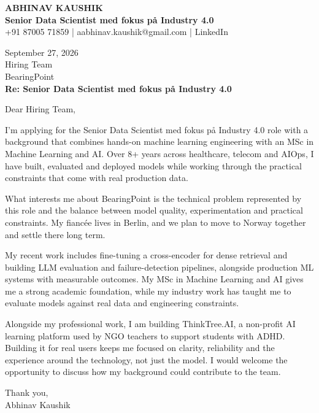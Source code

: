 \documentclass[10pt,a4paper]{article}
\begin{document}
\begin{center}
{\Large\bfseries ABHINAV KAUSHIK}\\[2pt]
{\bfseries Senior Data Scientist med fokus på Industry 4.0}\\[2pt]
+91 87005 71859 \quad | \quad aabhinav.kaushik@gmail.com \quad | \quad LinkedIn
\end{center}
\vspace{8pt}
September 27, 2026\\[6pt]
Hiring Team\\
BearingPoint\\[4pt]
\textbf{Re: Senior Data Scientist med fokus på Industry 4.0}

Dear Hiring Team,

I’m applying for the Senior Data Scientist med fokus på Industry 4.0 role with a background that combines hands-on machine learning engineering with an MSc in Machine Learning and AI. Over 8+ years across healthcare, telecom and AIOps, I have built, evaluated and deployed models while working through the practical constraints that come with real production data.

What interests me about BearingPoint is the technical problem represented by this role and the balance between model quality, experimentation and practical constraints. My fiancée lives in Berlin, and we plan to move to Norway together and settle there long term.

My recent work includes fine-tuning a cross-encoder for dense retrieval and building LLM evaluation and failure-detection pipelines, alongside production ML systems with measurable outcomes. My MSc in Machine Learning and AI gives me a strong academic foundation, while my industry work has taught me to evaluate models against real data and engineering constraints.

Alongside my professional work, I am building ThinkTree.AI, a non-profit AI learning platform used by NGO teachers to support students with ADHD. Building it for real users keeps me focused on clarity, reliability and the experience around the technology, not just the model. I would welcome the opportunity to discuss how my background could contribute to the team.

Thank you,\\
Abhinav Kaushik
\end{document}
